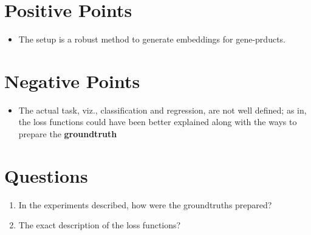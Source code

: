 \section{Positive Points}
\begin{itemize}
    \item The setup is a robust method to generate embeddings for gene-prducts.
\end{itemize}


\section{Negative Points}
\begin{itemize}
    \item The actual task, viz., classification and regression, are not well defined;
    as in, the loss functions could have been better explained along with the ways to prepare
    the \textbf{groundtruth}
\end{itemize}


\section{Questions}
\begin{enumerate}
    \item In the experiments described, how were the groundtruths prepared?
    \item The exact description of the loss functions?
\end{enumerate}